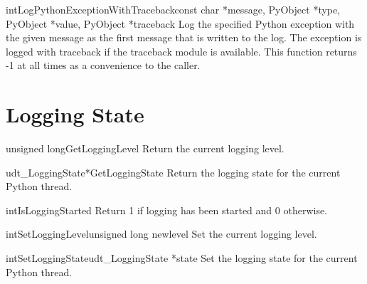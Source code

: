 \documentclass{manual}
\begin{document}
\begin{cfuncdesc}{int}{LogPythonExceptionWithTraceback}{const char *message,
        PyObject *type, PyObject *value, PyObject *traceback}
  Log the specified Python exception with the given message as the first
  message that is written to the log. The exception is logged with traceback if
  the traceback module is available. This function returns -1 at all times as a
  convenience to the caller.
\end{cfuncdesc}


\section{Logging State\label{cLoggingState}}

\begin{cfuncdesc}{unsigned long}{GetLoggingLevel}{}
  Return the current logging level.
\end{cfuncdesc}

\begin{cfuncdesc}{udt_LoggingState*}{GetLoggingState}{}
  Return the logging state for the current Python thread.
\end{cfuncdesc}

\begin{cfuncdesc}{int}{IsLoggingStarted}{}
  Return 1 if logging has been started and 0 otherwise.
\end{cfuncdesc}

\begin{cfuncdesc}{int}{SetLoggingLevel}{unsigned long newlevel}
  Set the current logging level.
\end{cfuncdesc}

\begin{cfuncdesc}{int}{SetLoggingState}{udt_LoggingState *state}
  Set the logging state for the current Python thread.
\end{cfuncdesc}


\end{document}
